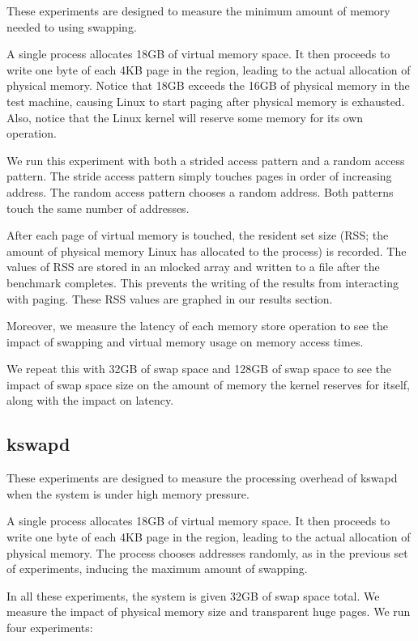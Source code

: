 \documentclass[twocolumn,11pt]{article}
\begin{document}
These experiments are designed to measure the minimum amount of memory needed
to using swapping.

A single process allocates 18GB of virtual memory space. It then proceeds to
write one byte of each 4KB page in the region, leading to the actual allocation
of physical memory. Notice that 18GB exceeds the 16GB of physical memory in the
test machine, causing Linux to start paging after physical memory is exhausted.
Also, notice that the Linux kernel will reserve some memory for its own
operation.

We run this experiment with both a strided access pattern and a random access
pattern. The stride access pattern simply touches pages in order of increasing
address. The random access pattern chooses a random address. Both patterns touch
the same number of addresses.

After each page of virtual memory is touched, the resident set size (RSS; the
amount of physical memory Linux has allocated to the process) is recorded.  The
values of RSS are stored in an mlocked array and written to a file after the
benchmark completes. This prevents the writing of the results from interacting
with paging. These RSS values are graphed in our results section.

Moreover, we measure the latency of each memory store operation to see the
impact of swapping and virtual memory usage on memory access times.

We repeat this with 32GB of swap space and 128GB of swap space to see the
impact of swap space size on the amount of memory the kernel reserves for
itself, along with the impact on latency.

\subsection{kswapd}

These experiments are designed to measure the processing overhead of kswapd when
the system is under high memory pressure.

A single process allocates 18GB of virtual memory space. It then proceeds to
write one byte of each 4KB page in the region, leading to the actual allocation
of physical memory. The process chooses addresses randomly, as in the previous
set of experiments, inducing the maximum amount of swapping.

In all these experiments, the system is given 32GB of swap space total. We
measure the impact of physical memory size and transparent huge pages. We run
four experiments:
\end{document}
